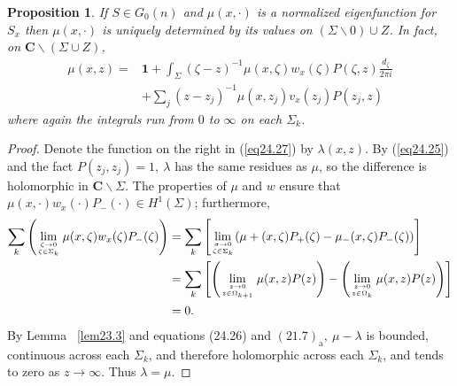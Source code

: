 \documentclass{surv-l}
\theoremstyle{plain}
\newtheorem{prop}[theorem]{Proposition}
\theoremstyle{definition}
\numberwithin{equation}{chapter}
\begin{document}
\setcounter{theorem}{25}
\begin{prop}\label{prop24.26}
If $S\in G_{0}(n)$ and $\mu(x, \cdot)$ is a normalized eigenfunction for $S_{x}$ then $\mu(x, \cdot)$ is uniquely determined by its values on $(\Sigma\backslash 0)\cup Z$. In fact, on $\mathbf{C}\backslash (\Sigma\cup Z)$,
\renewcommand{\theequation}{\thesection.\arabic{equation}}
\setcounter{section}{24}
\setcounter{equation}{26}
\begin{align}\label{eq24.27}
\mu(x, z)= & \mathbf{1}+\int_{\Sigma}(\zeta-z)^{-1}\mu(x, \zeta)w_{x}(\zeta)P(\zeta, z)\frac{d_{\zeta}}{2\pi i}\\
& +\sum_{j}(z-z_{j})^{-1}\mu(x, z_{j})v_{x}(z_{j})P(z_{j}, z) \nonumber
\end{align}
where again the integrals run from $0$ to $\infty$ on each $\Sigma_{k}$.
\end{prop}
\begin{proof}
Denote the function on the right in (\ref{eq24.27}) by $\lambda(x, z)$. By (\ref{eq24.25}) and the fact $P(z_{j},z_{j})=1,\ \lambda$ has the same residues as $\mu$, so the difference is holomorphic in $\textbf{C}\backslash \Sigma$. The properties of $\mu$ and $w$ ensure that $\mu(x, \cdot)w_{x}(\cdot)P_{-}(\cdot)\in H^{1}(\Sigma)$; furthermore,
\begin{align*}
\sum_{k}\left(\lim_{{\zeta\rightarrow 0}\atop{\zeta\in \Sigma_{k}}} \mu(x,\zeta)w_{x}(\zeta)P_{-}  (\zeta)\right) &= \sum_{k}\left[\lim_{{\sigma\rightarrow 0}\atop{\zeta\in \Sigma_{k}}}(\mu+(x, \zeta)P_{+}(\zeta)-\mu_{-}(x, \zeta)P_{-}(\zeta))\right]\\
& =\sum_{k} \left[  \left(\lim_{{z\rightarrow0}\atop{z\in\Omega_{k+1}}}\mu(x,z)P(z)\right) - \left(\lim_{{z\rightarrow 0}\atop{z\in\Omega_{k}}}\mu(x, z)P(z)\right) \right]\\
& =0.
\end{align*}
By Lemma ~\ref{lem23.3} and equations (24.26) and $(21.7)_{\mathrm{a}},\ \mu-\lambda$ is bounded, continuous across each $\Sigma_{k}$, and therefore holomorphic across each $\Sigma_{k}$, and tends to zero as $z\rightarrow\infty$. Thus $\lambda=\mu$.
\end{proof}
\end{document}
